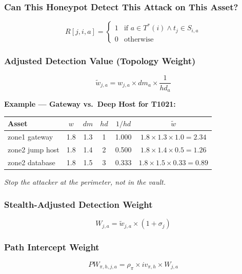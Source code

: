 \documentclass[journal]{IEEEtran}
\newcommand{\tildeW}{\tilde{w}}
\begin{document}
\subsubsection{Can This Honeypot Detect This Attack
              on This Asset?}
\begin{equation}
  R[j,i,a] =
  \begin{cases}
    1 & \text{if } a \in T^*(i) \wedge t_j \in S_{i,a} \\
    0 & \text{otherwise}
  \end{cases}
\end{equation}

\subsubsection{Adjusted Detection Value (Topology Weight)}
\begin{equation}
  \tildeW_{j,a} = w_{j,a} \times dm_a \times \frac{1}{hd_a}
\end{equation}

\begin{examplebox}
\textbf{Example --- Gateway vs.\ Deep Host for T1021:}
\begin{center}
\small
\renewcommand{\arraystretch}{1.1}
\begin{tabular}{@{}lccccc@{}}
\toprule
\textbf{Asset} & $w$ & $dm$ & $hd$ & $1/hd$ & $\tildeW$ \\
\midrule
zone1 gateway   & 1.8 & 1.3 & 1 & 1.000 &
  $1.8\!\times\!1.3\!\times\!1.0=\mathbf{2.34}$ \\
zone2 jump host & 1.8 & 1.4 & 2 & 0.500 &
  $1.8\!\times\!1.4\!\times\!0.5=\mathbf{1.26}$ \\
zone2 database  & 1.8 & 1.5 & 3 & 0.333 &
  $1.8\!\times\!1.5\!\times\!0.33=\mathbf{0.89}$ \\
\bottomrule
\end{tabular}
\end{center}
\textit{Stop the attacker at the perimeter, not in the vault.}
\end{examplebox}

\subsubsection{Stealth-Adjusted Detection Weight}
\begin{equation}
  W_{j,a} = \tildeW_{j,a} \times (1 + \sigma_j)
\end{equation}

\subsubsection{Path Intercept Weight}
\begin{equation}
  PW_{\pi,h,j,a} = \rho_\pi \times iv_{\pi,h} \times W_{j,a}
\end{equation}
\end{document}

